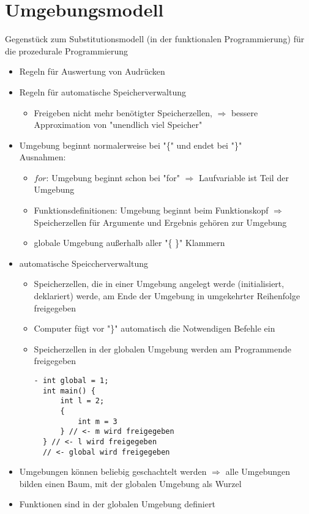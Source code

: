 \documentclass[a4paper]{scrartcl}
\begin{document}
\section{Umgebungsmodell}
\label{sec-11}
Gegenstück zum Substitutionsmodell (in der funktionalen Programmierung) für die prozedurale Programmierung
\begin{itemize}
\item Regeln für Auswertung von Audrücken
\item Regeln für automatische Speicherverwaltung
\begin{itemize}
\item Freigeben nicht mehr benötigter Speicherzellen, $\Rightarrow$ bessere Approximation von "unendlich viel Speicher"
\end{itemize}
\item Umgebung beginnt normalerweise bei "\{" und endet bei "\}" \\
    Ausnahmen:
\begin{itemize}
\item $for$: Umgebung beginnt schon bei "for" $\Rightarrow$ Laufvariable ist Teil der Umgebung
\item Funktionsdefinitionen: Umgebung beginnt beim Funktionskopf $\Rightarrow$ Speicherzellen für Argumente und Ergebnis gehören zur Umgebung
\item globale Umgebung außerhalb aller "\{ \}" Klammern
\end{itemize}
\item automatische Speiccherverwaltung
\begin{itemize}
\item Speicherzellen, die in einer Umgebung angelegt werde (initialisiert, deklariert) werde, am Ende der Umgebung in umgekehrter Reihenfolge freigegeben
\item Computer fügt vor "\}" automatisch die Notwendigen Befehle ein
\item Speicherzellen in der globalen Umgebung werden am Programmende freigegeben
\begin{verbatim}
- int global = 1;
  int main() {
	  int l = 2;
	  {
		  int m = 3
	  } // <- m wird freigegeben
  } // <- l wird freigegeben
  // <- global wird freigegeben
\end{verbatim}
\end{itemize}
\item Umgebungen können beliebig geschachtelt werden $\Rightarrow$ alle Umgebungen bilden einen Baum, mit der globalen Umgebung als Wurzel
\item Funktionen sind in der globalen Umgebung definiert

\end{itemize}
\end{document}
